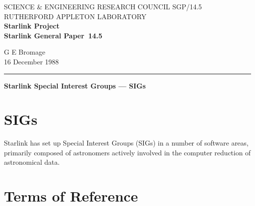 \pagestyle{myheadings}

\newcommand{\stardoccategory}  {Starlink General Paper}
\newcommand{\stardocinitials}  {SGP}
\newcommand{\stardocnumber}    {14.5}
\newcommand{\stardocauthors}   {G E Bromage}
\newcommand{\stardocdate}      {16 December 1988}
\newcommand{\stardoctitle}     {Starlink Special Interest Groups --- SIGs}

\newcommand{\stardocname}{\stardocinitials /\stardocnumber}
\markright{\stardocname}
\setlength{\textwidth}{160mm}
\setlength{\textheight}{240mm}
\setlength{\topmargin}{-5mm}
\setlength{\oddsidemargin}{0mm}
\setlength{\evensidemargin}{0mm}
\setlength{\parindent}{0mm}
\setlength{\parskip}{\medskipamount}
\setlength{\unitlength}{1mm}


\thispagestyle{empty}
SCIENCE \& ENGINEERING RESEARCH COUNCIL \hfill \stardocname\\
RUTHERFORD APPLETON LABORATORY\\
{\large\bf Starlink Project\\}
{\large\bf \stardoccategory\ \stardocnumber}
\begin{flushright}
\stardocauthors\\
\stardocdate
\end{flushright}
\vspace{-4mm}
\rule{\textwidth}{0.5mm}
\vspace{5mm}
\begin{center}
{\Large\bf \stardoctitle}
\end{center}
\vspace{5mm}

\section{SIGs}

Starlink has set up Special Interest Groups (SIGs) in a number of software
areas, primarily composed of astronomers actively involved in the computer
reduction of astronomical data.

\section{Terms of Reference}

